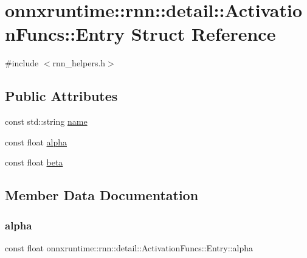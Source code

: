 \hypertarget{structonnxruntime_1_1rnn_1_1detail_1_1ActivationFuncs_1_1Entry}{}\section{onnxruntime\+:\+:rnn\+:\+:detail\+:\+:Activation\+Funcs\+:\+:Entry Struct Reference}
\label{structonnxruntime_1_1rnn_1_1detail_1_1ActivationFuncs_1_1Entry}


{\ttfamily \#include $<$rnn\+\_\+helpers.\+h$>$}

\subsection*{Public Attributes}
\begin{DoxyCompactItemize}
\item 
const std\+::string \mbox{\hyperlink{structonnxruntime_1_1rnn_1_1detail_1_1ActivationFuncs_1_1Entry_a19bacfed8cdc624be5bee21a275cd144}{name}}
\item 
const float \mbox{\hyperlink{structonnxruntime_1_1rnn_1_1detail_1_1ActivationFuncs_1_1Entry_ae474218a5c879b56110eaa29f016aeb0}{alpha}}
\item 
const float \mbox{\hyperlink{structonnxruntime_1_1rnn_1_1detail_1_1ActivationFuncs_1_1Entry_a21e1f0e0d6699332be80ca3ec4981946}{beta}}
\end{DoxyCompactItemize}


\subsection{Member Data Documentation}
\mbox{\label{structonnxruntime_1_1rnn_1_1detail_1_1ActivationFuncs_1_1Entry_ae474218a5c879b56110eaa29f016aeb0}} 
\subsubsection{\texorpdfstring{alpha}{alpha}}
{\footnotesize\ttfamily const float onnxruntime\+::rnn\+::detail\+::\+Activation\+Funcs\+::\+Entry\+::alpha}


